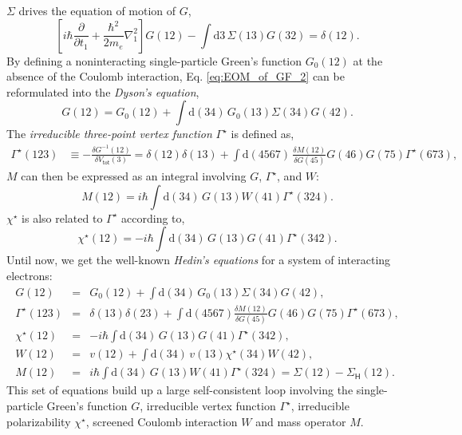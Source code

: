 \documentclass[11pt, oneside]{article}          %
\begin{document}
$\Sigma$ drives the equation of motion of $G$,
\begin{equation}
  \label{eq:EOM_of_GF_2}
  \left [ i \hbar \frac{\partial}{\partial t_1} + \frac{\hbar^2}{2m_e} \nabla^2_1 \right ] G(12) - \int \mathrm{d}3 \, \Sigma(13) G(32) = \delta(12).
\end{equation}
By defining a noninteracting single-particle Green's function $G_{0}(12)$ at the absence of the Coulomb interaction, Eq. \eqref{eq:EOM_of_GF_2} can be reformulated into the \emph{Dyson's equation},
\begin{equation}
  \label{eq:DysonEquation}
  G(12) = G_0(12) + \int \mathrm{d}(34) \, G_0(13) \Sigma (34) G(42).
\end{equation}
The \emph{irreducible three-point vertex function} $\Gamma^{\star}$ is defined as,
\begin{equation}
  \label{eq:def_vertex}
  \begin{aligned}
    \Gamma^{\star}(123) & \equiv - \frac{\delta G^{-1}(12)}{\delta V_{\mathsf{tot}}(3)} = \delta(12) \delta(13) + \int \mathrm{d}(4567) \, \frac{\delta M(12)}{\delta G(45)} G(46) G(75) \Gamma^{\star}(673),
  \end{aligned}
\end{equation}
$M$ can then be expressed as an integral involving $G$, $\Gamma^{\star}$, and $W$:
\begin{equation}
  \label{eq:Electron self-energy}
  M(12) = i \hbar \int \mathrm{d}(34) \, G(13) W(41) \Gamma^{\star}(324).
\end{equation}
$\chi^{\star}$ is also related to $\Gamma^{\star}$ according to,
\begin{equation}
  \label{eq:P_e(12)}
  \chi^{\star}(12) = - i \hbar \int \mathrm{d}(34) \, G(13) G(41)\Gamma^{\star}(342).
\end{equation}
Until now, we get the well-known \emph{Hedin's equations} \cite{hedin1965new,hedin1970effects} for a system of interacting electrons:
\begin{eqnarray}
  \label{eq:hedinsequation_1}
  G(12) & = & G_0(12) + \int \mathrm{d}(34) \, G_0(13) \Sigma (34) G(42), \\
  \label{eq:hedinsequation_2}
  \Gamma^{\star}(123) & = & \delta(13) \delta(23) + \int \mathrm{d} (4567) \frac{\delta M(12)}{\delta G(45)} G(46) G(75) \Gamma^{\star}(673), \\
  \label{eq:hedinsequation_3}
  \chi^{\star}(12) & = & - i \hbar \int \mathrm{d} (34) \, G(13) G(41) \Gamma^{\star}(342), \\
  \label{eq:hedinsequation_4}
  W(12) & = & v(12) + \int \mathrm{d} (34 )\, v(13) \chi^{\star}(34) W(42), \\
  \label{eq:hedinsequation_5}
  M(12) & = & i \hbar \int \mathrm{d}(34) \, G(13) W(41) \Gamma^{\star}(324) = \Sigma(12) - \Sigma_{\mathsf{H}}(12).
\end{eqnarray}
This set of equations build up a large self-consistent loop involving the single-particle Green's function $G$, irreducible vertex function $\Gamma^{\star}$, irreducible polarizability $\chi^{\star}$, screened Coulomb interaction $W$ and mass operator $M$.
\end{document}
